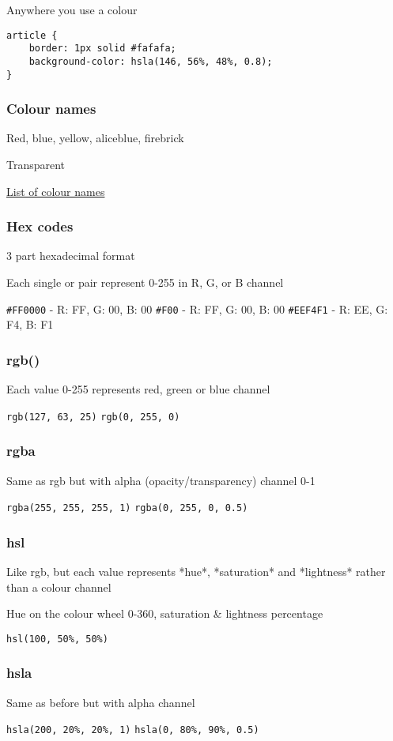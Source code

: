 Anywhere you use a colour

\begin{verbatim}
article {
    border: 1px solid #fafafa;
    background-color: hsla(146, 56%, 48%, 0.8);
}
\end{verbatim}

\subsubsection{Colour names}

Red, blue, yellow, aliceblue, firebrick

Transparent

\href{https://en.wikipedia.org/wiki/X11_color_names}{List of colour names}


\subsubsection{Hex codes}

3 part hexadecimal format

Each single or pair represent 0-255 in R, G, or B channel

\texttt{\#FF0000} - R: FF, G: 00, B: 00
\texttt{\#F00} - R: FF, G: 00, B: 00
\texttt{\#EEF4F1} - R: EE, G: F4, B: F1

\subsubsection{rgb()}

Each value 0-255 represents red, green or blue channel

\texttt{rgb(127, 63, 25)}
\texttt{rgb(0, 255, 0)}

\subsubsection{rgba}

Same as rgb but with alpha (opacity/transparency) channel 0-1

\texttt{rgba(255, 255, 255, 1)}
\texttt{rgba(0, 255, 0, 0.5)}

\subsubsection{hsl}

Like rgb, but each value represents *hue*, *saturation* and *lightness* rather than a colour channel

Hue on the colour wheel 0-360, saturation \& lightness percentage

\texttt{hsl(100, 50\%, 50\%)}

\subsubsection{hsla}

Same as before but with alpha channel

\texttt{hsla(200, 20\%, 20\%, 1)}
\texttt{hsla(0, 80\%, 90\%, 0.5)}
